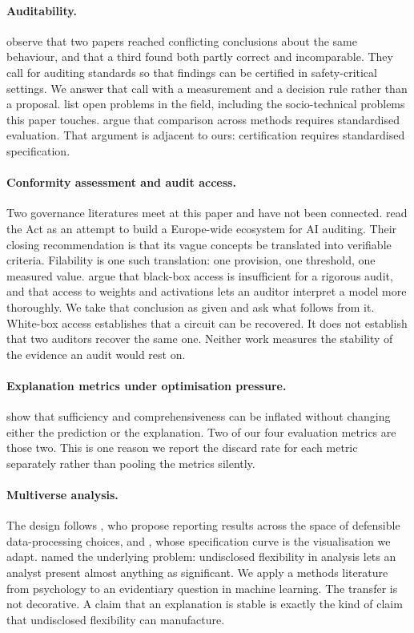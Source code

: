 \documentclass[letterpaper]{article} %
\begin{document}
\paragraph{Auditability.}
\citet{lan2026} observe that two papers reached conflicting conclusions about the
same behaviour, and that a third found both partly correct and incomparable. They
call for auditing standards so that findings can be certified in safety-critical
settings. We answer that call with a measurement and a decision rule rather than
a proposal. \citet{sharkey2025} list open problems in the field, including the
socio-technical problems this paper touches. \citet{mueller2025} argue that
comparison across methods requires standardised evaluation. That argument is
adjacent to ours: certification requires standardised specification.

\paragraph{Conformity assessment and audit access.} Two governance literatures
meet at this paper and have not been connected. \citet{mokander2022} read the
Act as an attempt to build a Europe-wide ecosystem for AI auditing. Their
closing recommendation is that its vague concepts be translated into verifiable
criteria. Filability is one such translation: one provision, one threshold, one
measured value. \citet{casper2024} argue that black-box access is insufficient
for a rigorous audit, and that access to weights and activations lets an auditor
interpret a model more thoroughly. We take that conclusion as given and ask what
follows from it. White-box access establishes that a circuit can be recovered.
It does not establish that two auditors recover the same one. Neither work
measures the stability of the evidence an audit would rest on.

\paragraph{Explanation metrics under optimisation pressure.}
\citet{hsia2023} show that sufficiency and comprehensiveness can be inflated
without changing either the prediction or the explanation. Two of our four
evaluation metrics are those two. This is one reason we report the discard rate
for each metric separately rather than pooling the metrics silently.

\paragraph{Multiverse analysis.}
The design follows \citet{steegen2016}, who propose reporting results across the
space of defensible data-processing choices, and \citet{simonsohn2020}, whose
specification curve is the visualisation we adapt. \citet{simmons2011} named the
underlying problem: undisclosed flexibility in analysis lets an analyst present
almost anything as significant. We apply a methods literature from psychology to
an evidentiary question in machine learning. The transfer is not decorative. A
claim that an explanation is stable is exactly the kind of claim that undisclosed
flexibility can manufacture.
\end{document}
